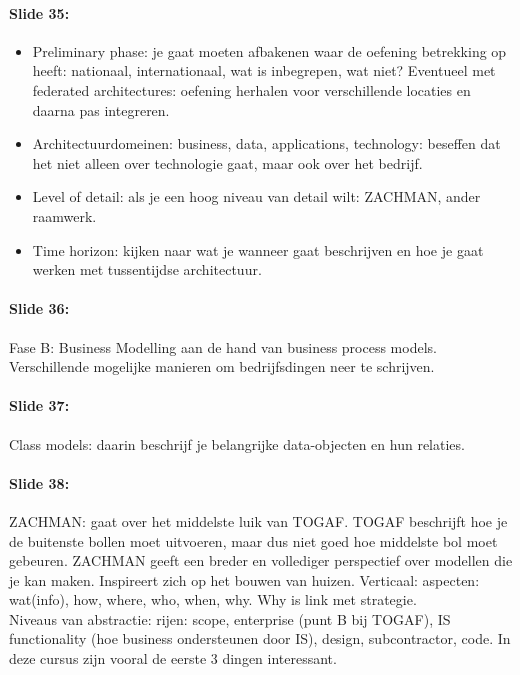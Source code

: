 \documentclass[10pt,a4paper]{report}
\begin{document}
\paragraph{Slide 35:}
\begin{itemize} 
\item Preliminary phase: je gaat moeten afbakenen waar de oefening betrekking op heeft: nationaal, internationaal, wat is inbegrepen, wat niet? Eventueel met federated architectures: oefening herhalen voor verschillende locaties en daarna pas integreren.
\item Architectuurdomeinen: business, data, applications, technology: beseffen dat het niet alleen over technologie gaat, maar ook over het bedrijf.
\item Level of detail: als je een hoog niveau van detail wilt: ZACHMAN, ander raamwerk.
\item Time horizon: kijken naar wat je wanneer gaat beschrijven en hoe je gaat werken met tussentijdse architectuur.
\end{itemize}	
	
\paragraph{Slide 36:}Fase B: Business Modelling aan de hand van business process models. Verschillende mogelijke manieren om bedrijfsdingen neer te schrijven.

\paragraph{Slide 37:}Class models: daarin beschrijf je belangrijke data-objecten en hun relaties. 

\paragraph{Slide 38:}ZACHMAN: gaat over het middelste luik van TOGAF. TOGAF beschrijft hoe je de buitenste bollen moet uitvoeren, maar dus niet goed hoe middelste bol moet gebeuren. ZACHMAN geeft een breder en vollediger perspectief over modellen die je kan maken. Inspireert zich op het bouwen van huizen. Verticaal: aspecten: wat(info), how, where, who, when, why. Why is link met strategie.\\
Niveaus van abstractie: rijen: scope, enterprise (punt B bij TOGAF), IS functionality (hoe business ondersteunen door IS), design, subcontractor, code. In deze cursus zijn vooral de eerste 3 dingen interessant.
\end{document}
